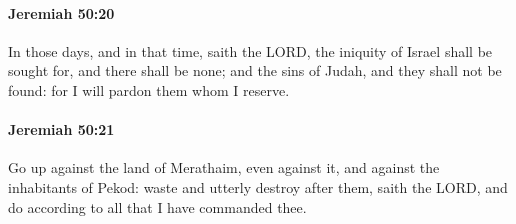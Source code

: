 		\paragraph{Jeremiah 50:20} %
			\label{JEREMIAH-50-20}

			In those days, and in that time, saith the LORD, the iniquity of Israel shall be sought for, and there shall be none; and the sins of Judah, and they shall not be found: for I will pardon them whom I reserve.


		\paragraph{Jeremiah 50:21} %
			\label{JEREMIAH-50-21}

			Go up against the land of Merathaim, even against it, and against the inhabitants of Pekod: waste and utterly destroy after them, saith the LORD, and do according to all that I have commanded thee.

